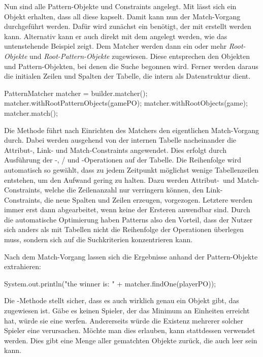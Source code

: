Nun sind alle Pattern-Objekte und Constraints angelegt.
Mit  lässt sich ein Objekt erhalten, dass all diese kapselt.
Damit kann nun der Match-Vorgang durchgeführt werden.
Dafür wird zunächst ein  benötigt, der mit  erstellt werden kann.
Alternativ kann er auch direkt mit dem  angelegt werden, wie das untenstehende Beispiel zeigt.
Dem Matcher werden dann ein oder mehr \emph{Root-Objekte} und \emph{Root-Pattern-Objekte} zugewiesen.
Diese entsprechen den Objekten und Pattern-Objekten, bei denen die Suche begonnen wird.
Ferner werden daraus die initialen Zeilen und Spalten der Tabelle, die intern als Datenstruktur dient.

\begin{jcodeblock}
    PatternMatcher matcher = builder.matcher();
    matcher.withRootPatternObjects(gamePO);
    matcher.withRootObjects(game);
    matcher.match();
\end{jcodeblock}

Die Methode  führt nach Einrichten des Matchers den eigentlichen Match-Vorgang durch.
Dabei werden ausgehend von der internen Tabelle nacheinander die Attribut-, Link- und Match-Constraints angewendet.
Dies erfolgt durch Ausführung der -,  /  und -Operationen auf der Tabelle.
Die Reihenfolge wird automatisch so gewählt, dass zu jedem Zeitpunkt möglichst wenige Tabellenzeilen entstehen, um den Aufwand gering zu halten.
Dazu werden Attribut-\ und Match-Constraints, welche die Zeilenanzahl nur verringern können, den Link-Constraints, die neue Spalten und Zeilen erzeugen, vorgezogen.
Letztere werden immer erst dann abgearbeitet, wenn keine der Ersteren anwendbar sind.
Durch die automatische Optimierung haben Patterns also den Vorteil, dass der Nutzer sich anders als mit Tabellen nicht die Reihenfolge der Operationen überlegen muss, sondern sich auf die Suchkriterien konzentrieren kann.

Nach dem Match-Vorgang lassen sich die Ergebnisse anhand der Pattern-Objekte extrahieren:

\begin{jcodeblock}
    System.out.println("the winner is: " + matcher.findOne(playerPO));
\end{jcodeblock}

Die -Methode stellt sicher, dass es auch wirklich genau ein Objekt gibt, das  zugewiesen ist.
Gäbe es keinen Spieler, der das Minimum an Einheiten erreicht hat, würde sie eine  werfen.
Andererseits würde die Existenz mehrerer solcher Spieler eine  verursachen.
Möchte man dies erlauben, kann stattdessen  verwendet werden.
Dies gibt eine Menge aller gematchten Objekte zurück, die auch leer sein kann.

